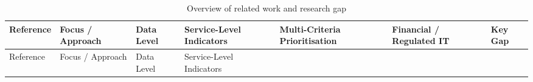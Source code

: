 \documentclass[
  12pt,
  letterpaper,
  12pt,
  oneside,
  english,
  onehalfspacing,
  headsepline]{MastersDoctoralThesis}
\begin{document}
\begin{longtable}[]{@{}
  >{\raggedright\arraybackslash}p{}
  >{\raggedright\arraybackslash}p{}
  >{\raggedright\arraybackslash}p{}
  >{\raggedright\arraybackslash}p{}
  >{\raggedright\arraybackslash}p{}
  >{\raggedright\arraybackslash}p{}
  >{\raggedright\arraybackslash}p{}@{}}
\caption{Overview of related work and research
gap}\label{tbl-lit-overview}\tabularnewline
\toprule\noalign{}
\begin{minipage}[b]{\linewidth}\raggedright
Reference
\end{minipage} & \begin{minipage}[b]{\linewidth}\raggedright
Focus / Approach
\end{minipage} & \begin{minipage}[b]{\linewidth}\raggedright
Data Level
\end{minipage} & \begin{minipage}[b]{\linewidth}\raggedright
Service-Level Indicators
\end{minipage} & \begin{minipage}[b]{\linewidth}\raggedright
Multi-Criteria Prioritisation
\end{minipage} & \begin{minipage}[b]{\linewidth}\raggedright
Financial / Regulated IT
\end{minipage} & \begin{minipage}[b]{\linewidth}\raggedright
Key Gap
\end{minipage} \\
\midrule\noalign{}
\endfirsthead
\toprule\noalign{}
\begin{minipage}[b]{\linewidth}\raggedright
Reference
\end{minipage} & \begin{minipage}[b]{\linewidth}\raggedright
Focus / Approach
\end{minipage} & \begin{minipage}[b]{\linewidth}\raggedright
Data Level
\end{minipage} & \begin{minipage}[b]{\linewidth}\raggedright
Service-Level Indicators
\end{minipage} & \begin{minipage}[b]{\linewidth}\raggedright

\end{minipage}
\end{longtable}
\end{document}

